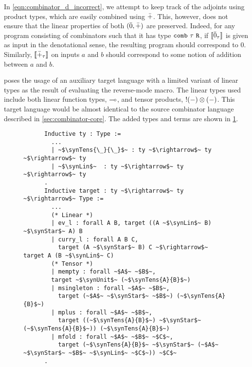   In \cref{eqn:combinator_d_incorrect}, we attempt to keep track of the adjoints using product types, which are easily combined using $\bar{+}$.
  This, however, does not ensure that the linear properties of both $(\bar{0}, \bar{+})$ are preserved.
  Indeed, for any program consisting of combinators such that it has type $\texttt{comb}\ \tau\ \texttt{R}$, if $\llbracket \bar{0}_\tau \rrbracket$ is given as input in the denotational sense, the resulting program should correspond to $0$.
  Similarly, $\llbracket \bar{+}_\tau \rrbracket$ on inputs $a$ and $b$ should correspond to some notion of addition between $a$ and $b$.

  \Vakar{} poses the usage of an auxiliary target language with a limited variant of linear types as the result of evaluating the reverse-mode macro\cite{vkr2020reverse}.
  The linear types used include both linear function types, $\multimap$, and tensor products, $!(-)\otimes(-)$.
  This target language would be almost identical to the source combinator language described in \cref{sec:combinator-core}.
  The added types and terms are shown in \cref{fig:combinator_linear}.

  \begin{figure}
    \centering
    \begin{verbatim}
      Inductive ty : Type :=
        ...
        | ~$\synTens{\_}{\_}$~ : ty ~$\rightarrow$~ ty ~$\rightarrow$~ ty
        | ~$\synLin$~  : ty ~$\rightarrow$~ ty ~$\rightarrow$~ ty
      .
      Inductive target : ty ~$\rightarrow$~ ty ~$\rightarrow$~ Type :=
        ...
        (* Linear *)
        | ev_l : forall A B, target ((A ~$\synLin$~ B) ~$\synStar$~ A) B
        | curry_l : forall A B C,
          target (A ~$\synStar$~ B) C ~$\rightarrow$~ target A (B ~$\synLin$~ C)
        (* Tensor *)
        | mempty : forall ~$A$~ ~$B$~,
        target ~$\synUnit$~ (~$\synTens{A}{B}$~)
        | msingleton : forall ~$A$~ ~$B$~,
          target (~$A$~ ~$\synStar$~ ~$B$~) (~$\synTens{A}{B}$~)
        | mplus : forall ~$A$~ ~$B$~,
          target ((~$\synTens{A}{B}$~) ~$\synStar$~ (~$\synTens{A}{B}$~)) (~$\synTens{A}{B}$~)
        | mfold : forall ~$A$~ ~$B$~ ~$C$~,
          target (~$\synTens{A}{B}$~ ~$\synStar$~ (~$A$~ ~$\synStar$~ ~$B$~ ~$\synLin$~ ~$C$~)) ~$C$~
      .
    \end{verbatim}
    \caption{}
    \label{fig:combinator_linear}
  \end{figure}

